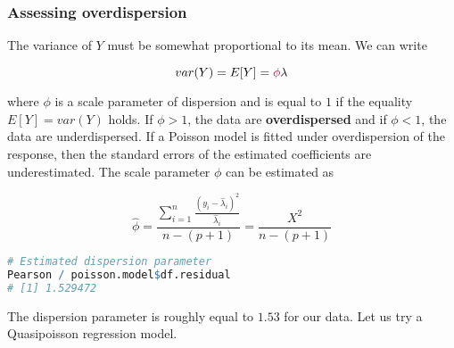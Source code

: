 \documentclass[border=5mm, convert, usenames, dvipsnames,beamer]{standalone}
\begin{document}
\begin{frame}[ fragile]{}
\frametitle{Assessing overdispersion}

\footnotesize
\vspace{15mm}
\noindent
The variance of $Y$ must be somewhat proportional to its mean. We can write

$$
var(Y) = E[Y] = { \color{purple} \phi} \lambda
$$

\noindent
where {\color{purple}$\phi$ is a scale parameter of dispersion} and is equal to $1$ if the equality $E[Y] = var(Y)$ holds. If $\phi > 1$, the data are \textbf{overdispersed} and if $\phi < 1$, the data are underdispersed. If a Poisson model is fitted under overdispersion of the response, then the standard errors of the estimated coefficients are underestimated. The scale parameter $\phi$ can be estimated as

$$
\hat{\phi} = \frac{\sum_{i=1}^{n} \frac{(y_{i} -\hat{ \lambda}_{i})^{2}}{\hat{\lambda}_{i}}}{n-(p+1)} = \frac{X^{2}}{n-(p+1)}
$$
\noindent
\par



\tiny
\begin{lstlisting}[language=R]
# Estimated dispersion parameter
Pearson / poisson.model$df.residual
# [1] 1.529472
\end{lstlisting}
\par

\footnotesize
\noindent
The dispersion parameter is roughly equal to $1.53$ for our data. Let us try a Quasipoisson regression model.
\par

\end{frame}
\end{document}
